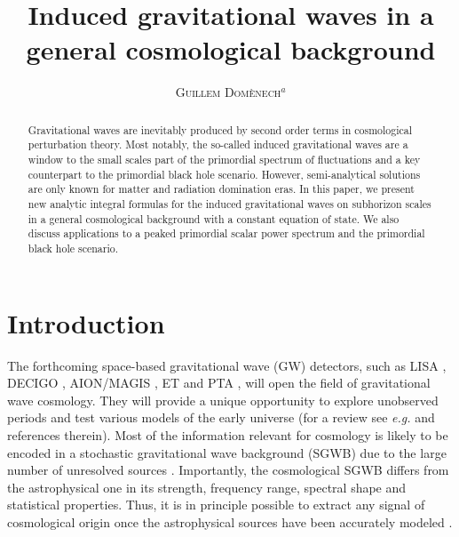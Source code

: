 \documentclass[aps,10pt,prd,groupedaddress,nofootinbib,notitlepage,eqsecnum,preprintnumbers]{revtex4-1}
\begin{document}
\title{Induced gravitational waves in a general cosmological background}


\author{\textsc{Guillem Dom\`enech$^{a}$}}



\begin{abstract}
Gravitational waves are inevitably produced by second order terms in cosmological perturbation theory. Most notably, the so-called induced gravitational waves are a window to the small scales part of the primordial spectrum of fluctuations and a key counterpart to the primordial black hole scenario. However, semi-analytical solutions are only known for matter and radiation domination eras. In this paper, we present new analytic integral formulas for the induced gravitational waves on subhorizon scales in a general cosmological background with a constant equation of state. We also discuss applications to a peaked primordial scalar power spectrum and the primordial black hole scenario. 
\end{abstract}
 \maketitle

\section{Introduction\label{sec:intro}}

The forthcoming space-based gravitational wave (GW) detectors, such as LISA \cite{Audley:2017drz}, DECIGO \cite{Seto:2001qf,Yagi:2011wg}, AION/MAGIS \cite{Badurina:2019hst}, ET \cite{ET} and PTA \cite{Lentati:2015qwp,Shannon:2015ect,Arzoumanian:2015liz,Qin:2018yhy}, will open the field of gravitational wave cosmology. They will provide a unique opportunity to explore unobserved periods and test various models of the early universe (for a review see \textit{e.g.} \cite{Maggiore:1999vm,Sathyaprakash:2009xs,Guzzetti:2016mkm,Caprini:2018mtu} and references therein). Most of the information relevant for cosmology is likely to be encoded in a stochastic gravitational wave background (SGWB) due to the large number of unresolved sources \cite{Guzzetti:2016mkm,Christensen:2018iqi,Caprini:2018mtu}. Importantly, the cosmological SGWB differs from the astrophysical one in its strength, frequency range, spectral shape and statistical properties. Thus, it is in principle possible to extract any signal of cosmological origin once the astrophysical sources have been accurately modeled \cite{Regimbau:2011rp}.
\end{document}
